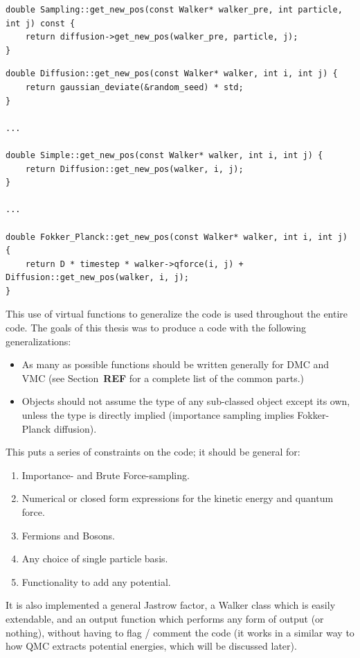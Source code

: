 \begin{lstlisting}
double Sampling::get_new_pos(const Walker* walker_pre, int particle, int j) const {
    return diffusion->get_new_pos(walker_pre, particle, j);
}
\end{lstlisting}

\begin{lstlisting}
double Diffusion::get_new_pos(const Walker* walker, int i, int j) {
    return gaussian_deviate(&random_seed) * std;
}

...

double Simple::get_new_pos(const Walker* walker, int i, int j) {
    return Diffusion::get_new_pos(walker, i, j);
}

...

double Fokker_Planck::get_new_pos(const Walker* walker, int i, int j) {
    return D * timestep * walker->qforce(i, j) + Diffusion::get_new_pos(walker, i, j);
}
\end{lstlisting}

This use of virtual functions to generalize the code is used throughout the entire code. The goals of this thesis was to produce a code with the following generalizations:

\begin{itemize}
 \item As many as possible functions should be written generally for DMC and VMC (see Section~\textbf{REF} for a complete list of the common parts.)
 \item Objects should not assume the type of any sub-classed object except its own, unless the type is directly implied (importance sampling implies Fokker-Planck diffusion).
\end{itemize}

This puts a series of constraints on the code; it should be general for:

\begin{enumerate}[label=(\roman{*}), ref=(\roman{*})]
\item Importance- and Brute Force-sampling.
\item Numerical or closed form expressions for the kinetic energy and quantum force.
\item Fermions and Bosons.
\item Any choice of single particle basis.
\item Functionality to add any potential.
\end{enumerate}

It is also implemented a general Jastrow factor, a Walker class which is easily extendable, and an output function which performs any form of output (or nothing), without having to flag / comment the code (it works in a similar way to how QMC extracts potential energies, which will be discussed later). 

